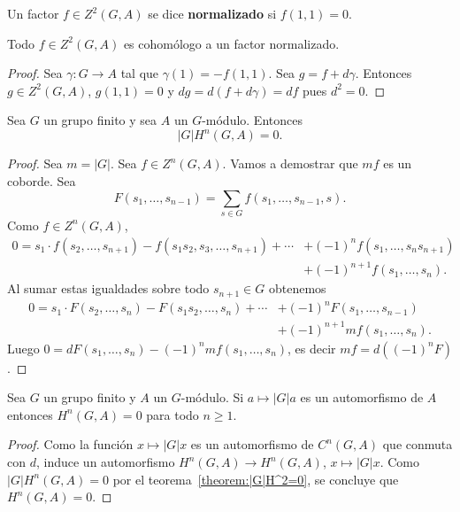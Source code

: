 Un factor $f\in Z^2(G,A)$ se dice \textbf{normalizado} si $f(1,1)=0$. 

\begin{lemma}
	\label{lemma:normalizado}
	Todo $f\in Z^2(G,A)$ es cohomólogo a un factor normalizado. 
\end{lemma}

\begin{proof}
	Sea $\gamma\colon G\to A$ tal que $\gamma(1)=-f(1,1)$. Sea
	$g=f+d\gamma$. Entonces $g\in Z^2(G,A)$, $g(1,1)=0$ y $dg=d(f+d\gamma)=df$ pues
	$d^2=0$. 
\end{proof}

\begin{theorem}
	\label{theorem:|G|H^2=0}
	Sea $G$ un grupo finito y sea $A$ un $G$-módulo. Entonces 
	\[
	|G|H^n(G,A)=0.
	\]
\end{theorem}

\begin{proof}
	Sea $m=|G|$. Sea $f\in Z^n(G,A)$. Vamos a demostrar que $mf$ es un coborde. Sea 
	\[
	F(s_1,\dots,s_{n-1})=\sum_{s\in G}f(s_1,\dots,s_{n-1},s).
	\]
	Como $f\in Z^n(G,A)$, 
	\begin{align*}
		0=s_1\cdot f(s_2,\dots,s_{n+1})-f(s_1s_2,s_3,\dots,s_{n+1})+\cdots&+(-1)^nf(s_1,\dots,s_ns_{n+1})\\
		&+(-1)^{n+1}f(s_1,\dots,s_n).
	\end{align*}
	Al sumar estas igualdades sobre todo $s_{n+1}\in G$ obtenemos 
	\begin{align*}
		0=s_1\cdot F(s_2,\dots,s_n)-F(s_1s_2,\dots,s_n)+\cdots&+(-1)^nF(s_1,\dots,s_{n-1})\\
		&+(-1)^{n+1}mf(s_1,\dots,s_n).
	\end{align*}
	Luego $0=dF(s_1,\dots,s_n)-(-1)^nmf(s_1,\dots,s_n)$, es decir $mf=d(
	(-1)^nF)$.
\end{proof}

\begin{corollary}
	\label{corollary:a->|G|a}
	Sea $G$ un grupo finito y $A$ un $G$-módulo. Si $a\mapsto |G|a$ es un
	automorfismo de $A$ entonces $H^n(G,A)=0$ para todo $n\geq1$. 
\end{corollary}

\begin{proof}
	Como la función $x\mapsto |G|x$ es un automorfismo de $C^n(G,A)$ que
	conmuta con $d$, induce un automorfismo $H^n(G,A)\to H^n(G,A)$, $x\mapsto
	|G|x$. Como $|G|H^n(G,A)=0$ por el teorema~\ref{theorem:|G|H^2=0}, se
	concluye que $H^n(G,A)=0$.
\end{proof}

